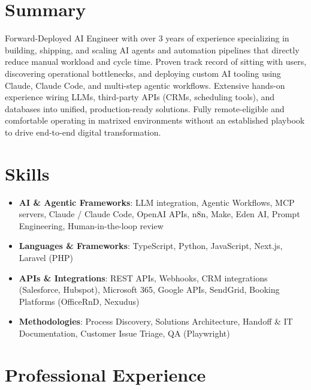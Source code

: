 \documentclass[11pt,a4paper,sans]{moderncv}
\begin{document}
\makecvtitle

\section{Summary}
Forward-Deployed AI Engineer with over 3 years of experience specializing in building, shipping, and scaling AI agents and automation pipelines that directly reduce manual workload and cycle time. Proven track record of sitting with users, discovering operational bottlenecks, and deploying custom AI tooling using Claude, Claude Code, and multi-step agentic workflows. Extensive hands-on experience wiring LLMs, third-party APIs (CRMs, scheduling tools), and databases into unified, production-ready solutions. Fully remote-eligible and comfortable operating in matrixed environments without an established playbook to drive end-to-end digital transformation.

\section{Skills}
\begin{itemize}
\item \textbf{AI \& Agentic Frameworks}: LLM integration, Agentic Workflows, MCP servers, Claude / Claude Code, OpenAI APIs, n8n, Make, Eden AI, Prompt Engineering, Human-in-the-loop review
\item \textbf{Languages \& Frameworks}: TypeScript, Python, JavaScript, Next.js, Laravel (PHP)
\item \textbf{APIs \& Integrations}: REST APIs, Webhooks, CRM integrations (Salesforce, Hubspot), Microsoft 365, Google APIs, SendGrid, Booking Platforms (OfficeRnD, Nexudus)
\item \textbf{Methodologies}: Process Discovery, Solutions Architecture, Handoff \& IT Documentation, Customer Issue Triage, QA (Playwright)
\end{itemize}

\section{Professional Experience}
\end{document}
